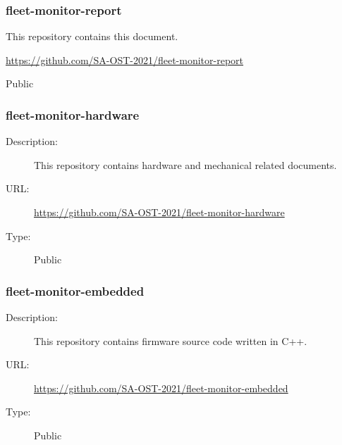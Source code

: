 \subsubsection{fleet-monitor-report} \vspace{-0.2cm}
\begin{description}
  \hfuzz=35.0pt
  \item[Description:] This repository contains this document.\vspace{-0.25cm}
  \item[URL:] \url{https://github.com/SA-OST-2021/fleet-monitor-report}\vspace{-0.25cm}
  \item[Type:] Public\vspace{-0.25cm}
\end{description}

\subsubsection{fleet-monitor-hardware} \vspace{-0.2cm}
\begin{description}
  \item[Description:] This repository contains hardware and mechanical related documents.\vspace{-0.25cm}
  \item[URL:] \url{https://github.com/SA-OST-2021/fleet-monitor-hardware}\vspace{-0.25cm}
  \item[Type:] Public\vspace{-0.25cm}
\end{description}

\subsubsection{fleet-monitor-embedded} \vspace{-0.2cm}
\begin{description}
  \item[Description:] This repository contains firmware source code written in C++.\vspace{-0.25cm}
  \item[URL:] \url{https://github.com/SA-OST-2021/fleet-monitor-embedded}\vspace{-0.25cm}
  \item[Type:] Public\vspace{-0.25cm}
\end{description}


